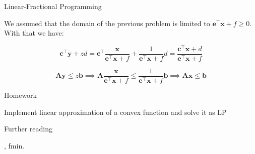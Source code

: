 \documentclass{beamer}
\begin{document}
\begin{frame}{Linear-Fractional Programming}
	\begin{flushleft}
		
		We assumed that the domain of the previous problem is limited to $\mathbf{e}^\top \mathbf{x} + f \geq 0$. With that we have:
		
		\begin{equation}
			 \mathbf{c}^\top \mathbf{y} + z d 
			 = 
			 \mathbf{c}^\top\frac{\mathbf{x}}{\mathbf{e}^\top \mathbf{x} + f} + \frac{1}{\mathbf{e}^\top \mathbf{x} + f} d 
			 =
			 \frac{\mathbf{c}^\top\mathbf{x} + d}{\mathbf{e}^\top \mathbf{x} + f}
		\end{equation}
		
		
		\begin{equation}
			\mathbf{A} \mathbf{y} \leq z \mathbf{b} 
			\implies
			\mathbf{A} \frac{\mathbf{x}}{\mathbf{e}^\top \mathbf{x} + f} \leq \frac{1}{\mathbf{e}^\top \mathbf{x} + f} \mathbf{b} 
			\implies
			\mathbf{A} \mathbf{x} \leq \mathbf{b} 
		\end{equation}
		
		
	\end{flushleft}
\end{frame}





\begin{frame}{Homework}
\begin{flushleft}

Implement linear approximation of a convex function and solve it as LP

\end{flushleft}
\end{frame}





\begin{frame}{Further reading}
	\begin{flushleft}
		
		, fmin.
		
	\end{flushleft}
\end{frame}






\myqrframe
\end{document}
